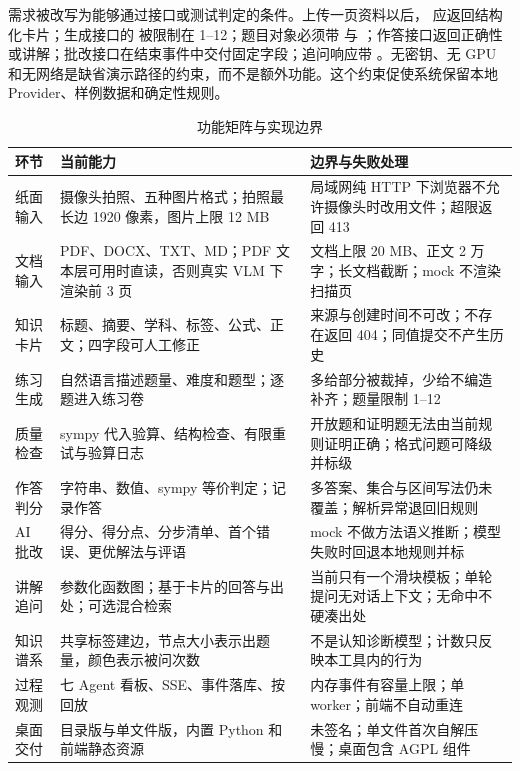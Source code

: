 需求被改写为能够通过接口或测试判定的条件。上传一页资料以后， 应返回结构化卡片；生成接口的  被限制在 1--12；题目对象必须带  与 ；作答接口返回正确性或讲解；批改接口在结束事件中交付固定字段；追问响应带 。无密钥、无 GPU 和无网络是缺省演示路径的约束，而不是额外功能。这个约束促使系统保留本地 Provider、样例数据和确定性规则。

\begin{table}[H]
\centering\footnotesize
\caption{功能矩阵与实现边界}
\begin{tabularx}{\textwidth}{@{}L{2.5cm}Y L{4.1cm}@{}}
\toprule
\textbf{环节} & \textbf{当前能力} & \textbf{边界与失败处理} \\
\midrule
纸面输入 & 摄像头拍照、五种图片格式；拍照最长边 1920 像素，图片上限 12 MB & 局域网纯 HTTP 下浏览器不允许摄像头时改用文件；超限返回 413 \\
文档输入 & PDF、DOCX、TXT、MD；PDF 文本层可用时直读，否则真实 VLM 下渲染前 3 页 & 文档上限 20 MB、正文 2 万字；长文档截断；mock 不渲染扫描页 \\
知识卡片 & 标题、摘要、学科、标签、公式、正文；四字段可人工修正 & 来源与创建时间不可改；不存在返回 404；同值提交不产生历史 \\
练习生成 & 自然语言描述题量、难度和题型；逐题进入练习卷 & 多给部分被裁掉，少给不编造补齐；题量限制 1--12 \\
质量检查 & sympy 代入验算、结构检查、有限重试与验算日志 & 开放题和证明题无法由当前规则证明正确；格式问题可降级并标级 \\
作答判分 & 字符串、数值、sympy 等价判定；记录作答 & 多答案、集合与区间写法仍未覆盖；解析异常退回旧规则 \\
AI 批改 & 得分、得分点、分步清单、首个错误、更优解法与评语 & mock 不做方法语义推断；模型失败时回退本地规则并标  \\
讲解追问 & 参数化函数图；基于卡片的回答与出处；可选混合检索 & 当前只有一个滑块模板；单轮提问无对话上下文；无命中不硬凑出处 \\
知识谱系 & 共享标签建边，节点大小表示出题量，颜色表示被问次数 & 不是认知诊断模型；计数只反映本工具内的行为 \\
过程观测 & 七 Agent 看板、SSE、事件落库、按  回放 & 内存事件有容量上限；单 worker；前端不自动重连 \\
桌面交付 & 目录版与单文件版，内置 Python 和前端静态资源 & 未签名；单文件首次自解压慢；桌面包含 AGPL 组件 \\
\bottomrule
\end{tabularx}
\end{table}

